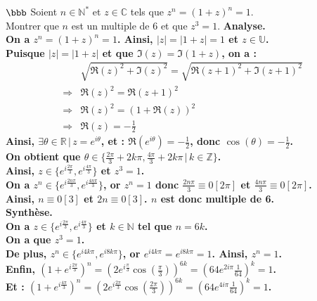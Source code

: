 \documentclass[11pt]{article}
\begin{document}
\begin{exercice}{$\bbb$}{}
    Soient $n\in\mathbb{N}^*$ et $z\in\mathbb{C}$ tels que $z^n=(1+z)^n=1$.\\
    Montrer que $n$ est un multiple de $6$ et que $z^3=1$.
    \tcblower
    \bf{Analyse.}\\
    On a $z^n = (1+z)^n = 1$. Ainsi, $|z|=|1+z|=1$ et $z\in\mathbb{U}$.\\[0.1cm]
    Puisque $|z|=|1+z|$ et que $\Im(z) = \Im(1+z)$, on a :
    \begin{align*}
        &\sqrt{\Re(z)^2 + \Im(z)^2} = \sqrt{\Re(z+1)^2 + \Im(z+1)^2}\\
        \Longrightarrow&\Re(z)^2=\Re(z+1)^2\\
        \Longrightarrow&\Re(z)^2=(1 + \Re(z))^2\\
        \Longrightarrow&\Re(z)=-\frac{1}{2}
    \end{align*}
    Ainsi, $\exists\theta\in\mathbb{R} \, | \, z=e^{i\theta}$, et : $\Re\left(e^{i\theta}\right)=-\frac{1}{2}$, donc $\cos(\theta)=-\frac{1}{2}$.\\[0.1cm]
    On obtient que $\theta\in\{\frac{2\pi}{3} + 2k\pi, \frac{4\pi}{3} + 2k\pi \, | \, k\in\mathbb{Z}\}$.\\[0.1cm]
    Ainsi, $z\in\{e^{i\frac{2\pi}{3}}, e^{i\frac{4\pi}{3}}\}$ et $z^3 = 1$.\\[0.1cm]
    On a $z^n\in\{e^{i\frac{2n\pi}{3}}, e^{i\frac{4n\pi}{3}}\}$, or $z^n=1$ donc $\frac{2n\pi}{3}\equiv0[2\pi]$ et $\frac{4n\pi}{3}\equiv0[2\pi]$.\\[0.1cm]
    Ainsi, $n \equiv 0[3]$ et $2n \equiv 0[3]$. $n$ est donc multiple de 6.\\[0.2cm]
    \bf{Synthèse}.\\[0.1cm]
    On a $z\in\{e^{i\frac{2\pi}{3}}, e^{i\frac{4\pi}{3}}\}$ et $k\in\mathbb{N}$ tel que $n=6k$.\\[0.1cm]
    On a que $z^3=1$.\\[0.1cm]
    De plus, $z^n\in\{e^{i4k\pi}, e^{i8k\pi}\}$, or $e^{i4k\pi} = e^{i8k\pi} = 1$. Ainsi, $z^n = 1$.\\[0.1cm]
    Enfin, $(1+e^{i\frac{2\pi}{3}})^n = (2e^{i\frac{\pi}{3}}\cos(\frac{\pi}{3}))^{6k}=(64e^{2i\pi}\frac{1}{64})^k=1$.\\[0.1cm]
    Et : $(1+e^{i\frac{4\pi}{3}})^n=(2e^{i\frac{2\pi}{3}}\cos(\frac{2\pi}{3}))^{6k}=(64e^{4i\pi}\frac{1}{64})^k=1$.
\end{exercice}
\end{document}
